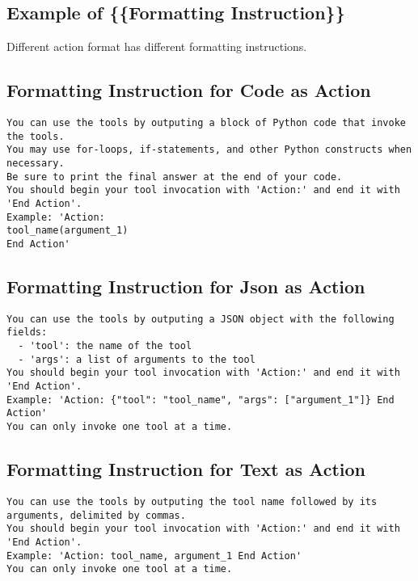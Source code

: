 \subsection{Example of \{\{Formatting Instruction\}\}}

Different action format has different formatting instructions.

\subsection{Formatting Instruction for Code as Action}

\begin{lstlisting}[breaklines]
You can use the tools by outputing a block of Python code that invoke the tools.
You may use for-loops, if-statements, and other Python constructs when necessary.
Be sure to print the final answer at the end of your code.
You should begin your tool invocation with 'Action:' and end it with 'End Action'.
Example: 'Action:
tool_name(argument_1)
End Action'
\end{lstlisting}

\subsection{Formatting Instruction for Json as Action}

\begin{lstlisting}[breaklines]
You can use the tools by outputing a JSON object with the following fields:
  - 'tool': the name of the tool
  - 'args': a list of arguments to the tool
You should begin your tool invocation with 'Action:' and end it with 'End Action'.
Example: 'Action: {"tool": "tool_name", "args": ["argument_1"]} End Action'
You can only invoke one tool at a time.
\end{lstlisting}

\subsection{Formatting Instruction for Text as Action}

\begin{lstlisting}[breaklines]
You can use the tools by outputing the tool name followed by its arguments, delimited by commas.
You should begin your tool invocation with 'Action:' and end it with 'End Action'.
Example: 'Action: tool_name, argument_1 End Action'
You can only invoke one tool at a time.
\end{lstlisting}



